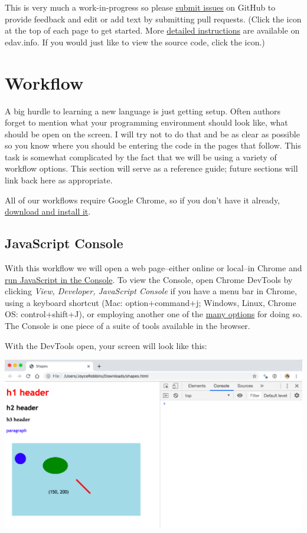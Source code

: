 \documentclass[openany]{book}
\begin{document}
This is very much a work-in-progress so please \href{https://github.com/jtr13/d3book/issues}{submit issues} on GitHub to provide feedback and edit or add text by submitting pull requests. (Click the icon at the top of each page to get started. More \href{https://edav.info/contribute.html\#step-2-click-the-edit-button}{detailed instructions} are available on edav.info. If you would just like to view the source code, click the icon.)

\hypertarget{workflow}{%
\section{Workflow}\label{workflow}}

A big hurdle to learning a new language is just getting setup. Often authors forget to mention what your programming environment should look like, what should be open on the screen. I will try not to do that and be as clear as possible so you know where you should be entering the code in the pages that follow. This task is somewhat complicated by the fact that we will be using a variety of workflow options. This section will serve as a reference guide; future sections will link back here as appropriate.

All of our workflows require Google Chrome, so if you don't have it already, \href{https://www.google.com/chrome/}{download and install it}.

\hypertarget{javascript-console}{%
\subsection{JavaScript Console}\label{javascript-console}}

With this workflow we will open a web page--either online or local--in Chrome and \href{https://developers.google.com/web/tools/chrome-devtools/console/javascript}{run JavaScript in the Console}. To view the Console, open Chrome DevTools by clicking \emph{View, Developer, JavaScript Console} if you have a menu bar in Chrome, using a keyboard shortcut (Mac: option+command+j; Windows, Linux, Chrome OS: control+shift+J), or employing another one of the \href{https://developers.google.com/web/tools/chrome-devtools/open}{many options} for doing so. The Console is one piece of a suite of tools available in the browser.

With the DevTools open, your screen will look like this:

\includegraphics[width=1\linewidth]{images/console}
\end{document}
